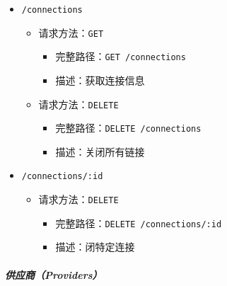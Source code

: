 \begin{itemize}
    \item \verb|/connections|
    \begin{itemize}
        \item 请求方法：\verb|GET|
        \begin{itemize}
            \item 完整路径：\verb|GET /connections|
            \item 描述：获取连接信息
        \end{itemize}
        \item 请求方法：\verb|DELETE|
        \begin{itemize}
            \item 完整路径：\verb|DELETE /connections|
            \item 描述：关闭所有链接
        \end{itemize}
    \end{itemize}
    \item \verb|/connections/:id|
    \begin{itemize}
        \item 请求方法：\verb|DELETE|
        \begin{itemize}
            \item 完整路径：\verb|DELETE /connections/:id|
            \item 描述：闭特定连接
        \end{itemize}
    \end{itemize}
\end{itemize}

\subparagraph{供应商（Providers）}

